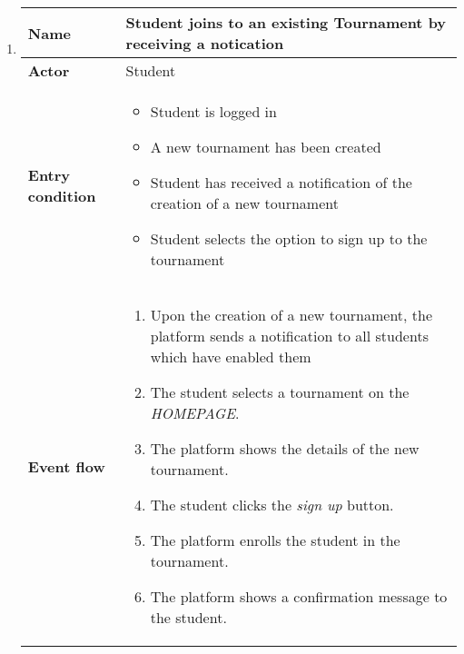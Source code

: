 \begin{enumerate}[label=\textbf{UC\arabic*}:,leftmargin=1.3cm]
      \item \textbf{}
            \begin{table}[H]
                  \centering
                  \begin{tabular}{|l|p{11.9cm}|}
                        \hline
                        \textbf{Name}            & Student joins to an existing Tournament by receiving a notication                          \\\hline
                        \textbf{Actor}           & Student                                                                                    \\\hline
                        \textbf{Entry condition} &
                        \begin{itemize}
                              \item Student is logged in
                              \item A new tournament has been created
                              \item Student has received a notification of the creation of a new tournament
                              \item Student selects the option to sign up to the tournament
                        \end{itemize}                                          \\\hline
                        \textbf{Event flow}      &
                        \begin{enumerate}[label=\arabic*.]
                              \item Upon the creation of a new tournament, the platform sends a notification to all students which have enabled them
                              \item The student selects a tournament on the \emph{HOMEPAGE}.
                              \item The platform shows the details of the new tournament.
                              \item The student clicks the \emph{sign up} button.
                              \item The platform enrolls the student in the tournament.
                              \item The platform shows a confirmation message to the student.
                        \end{enumerate} \\\hline

\end{tabular}
\end{table}
\end{enumerate}
